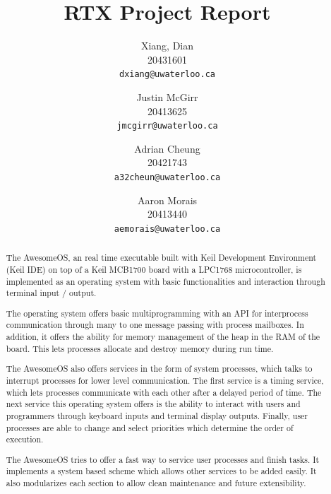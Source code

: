\documentclass[12pt]{report}
\begin{document}

\title{RTX Project Report}

\author{
    Xiang, Dian\\
    20431601\\
    \texttt{dxiang@uwaterloo.ca}
    \and
    Justin McGirr\\
    20413625\\
    \texttt{jmcgirr@uwaterloo.ca}
    \and
    Adrian Cheung\\
    20421743\\
    \texttt{a32cheun@uwaterloo.ca}
    \and
    Aaron Morais\\
    20413440\\
    \texttt{aemorais@uwaterloo.ca}
}

\maketitle

\begin{abstract}
    The AwesomeOS, an real time executable built with Keil Development Environment (Keil IDE) on top of a Keil MCB1700 board with a LPC1768 microcontroller, is implemented as an operating system with basic functionalities and interaction through terminal input / output.

    The operating system offers basic multiprogramming with an API for interprocess communication through many to one message passing with process mailboxes. In addition, it offers the ability for memory management of the heap in the RAM of the board. This lets processes allocate and destroy memory during run time.

    The AwesomeOS also offers services in the form of system processes, which talks to interrupt processes for lower level communication. The first service is a timing service, which lets processes communicate with each other after a delayed period of time. The next service this operating system offers is the ability to interact with users and programmers through keyboard inputs and terminal display outputs. Finally, user processes are able to change and select priorities which determine the order of execution.

    The AwesomeOS tries to offer a fast way to service user processes and finish tasks. It implements a system based scheme which allows other services to be added easily. It also modularizes each section to allow clean maintenance and future extensibility.

\end{abstract}
\end{document}
